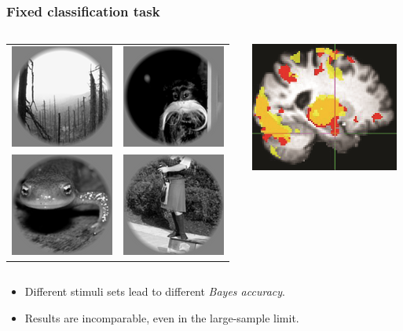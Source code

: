 \documentclass{beamer}
\begin{document}
\begin{frame}
\frametitle{Fixed classification task}
\begin{columns}
\begin{column}{0.6\textwidth}
\begin{tabular}{cc}
\includegraphics[scale = 0.5]{img5.png} &
\includegraphics[scale = 0.5]{img6.png} \\
\includegraphics[scale = 0.5]{img7.png} &
\includegraphics[scale = 0.5]{img8.png}
\end{tabular}
\end{column}
\begin{column}{0.4\textwidth}
\includegraphics[scale = 0.5]{smbrain2.png}
\end{column}
\end{columns}
\begin{itemize}
\item Different stimuli sets lead to different \emph{Bayes accuracy}.
\item Results are incomparable, even in the large-sample limit.
\end{itemize}
\end{frame}
\end{document}

